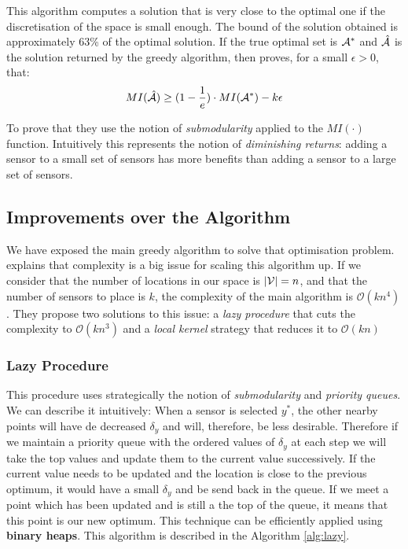 This algorithm computes a solution that is very close to the optimal one if the discretisation of the space is small enough. The bound of the solution obtained is approximately 63\% of the optimal solution. If the true optimal set is $\mathcal{A}^*$ and $\hat{\mathcal{A}}$ is the solution returned by the greedy algorithm, then \citet{krause_near-optimal_2008} proves, for a small $\epsilon >0 $, that: 
 \begin{equation}
    MI(\hat{\mathcal{A}}) \geq (1 - \frac{1}{e}) \cdot MI(\mathcal{A}^*) - k\epsilon
\end{equation}

To prove that they use the notion of \textit{submodularity} \citep{nemhauser_analysis_1978} applied to the $MI(\cdot)$ function. Intuitively this represents the notion of \textit{diminishing returns}:  adding a sensor to a small set of sensors has more benefits than adding a sensor to a large set of sensors. 


\subsection{Improvements over the Algorithm}



We have exposed the main greedy algorithm to solve that optimisation problem. \citet{krause_near-optimal_2008} explains that complexity is a big issue for scaling this algorithm up. If we consider that the number of locations in our space is $|\mathcal{V}| = n$, and that the number of sensors to place is $k$, the complexity of the main algorithm is $\mathcal{O}(kn^4)$. They propose two solutions to this issue: a \textit{lazy procedure} that cuts the complexity to  $\mathcal{O}(kn^3)$ and a \textit{local kernel} strategy that reduces it to $\mathcal{O}(kn)$

\subsubsection{Lazy Procedure} This procedure uses strategically the notion of \textit{submodularity} and \textit{priority queues}. We can describe it intuitively: When a sensor is selected $y^*$, the other nearby points will have de decreased $\delta_y$ and will, therefore, be less desirable. Therefore if we maintain a priority queue with the ordered values of $\delta_y$ at each step we will take the top values and update them to the current value successively. If the current value needs to be updated and the location is close to the previous optimum, it would have a small $\delta_y$ and be send back in the queue. If we meet a point which has been updated and is still a the top of the queue, it means that this point is our new optimum. This technique can be efficiently applied using \textbf{binary heaps}. This algorithm is described in the Algorithm \ref{alg:lazy}. \\ 



